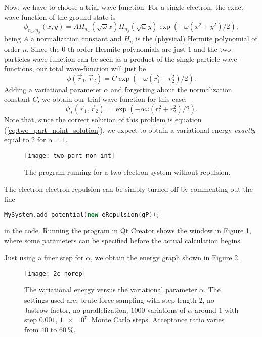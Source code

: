 Now, we have to choose a trial wave-function. For a single electron, the exact wave-function of the ground state is
\begin{equation}
	\phi_{n_x,n_y}(x, y) = A H_{n_x}(\sqrt{\omega}x)H_{n_y}(\sqrt{\omega}y)\exp\left(-\omega\left(x^2 + y^2\right)/2\right),
	\label{eq:phi_qnums}
\end{equation}
being $A$ a normalization constant and $H_n$ is the (physical) Hermite polynomial of order $n$. Since the 0-th order Hermite polynomials are just $1$ and the two-particles wave-function can be seen as a product of the single-particle wave-functions, our total wave-function will just be
\begin{equation}
	\phi(\vec{r}_1,\vec{r}_2) = C \exp\left(-\omega\left(r_1^2 + r_2^2\right)/2\right).
	\label{eq:two_part_noint_solution}
\end{equation}
Adding a variational parameter $\alpha$ and forgetting about the normalization constant $C$, we obtain our trial wave-function for this case:
\begin{equation}
	\psi_T(\vec{r}_1,\vec{r}_2) = \exp\left(-\alpha\omega\left(r_1^2 + r_2^2\right)/2\right).
\end{equation}
Note that, since the correct solution of this problem is equation (\ref{eq:two_part_noint_solution}), we expect to obtain a variational energy \emph{exactly} equal to 2 for $\alpha = 1$.

\begin{figure}[H]
	\centering
	\texttt{[image: two-part-non-int]}
	\caption{The program running for a two-electron system without repulsion.}
	\label{fig:run_window_2e_no_rep}
\end{figure}

The electron-electron repulsion can be simply turned off by commenting out the line
\begin{lstlisting}[language=cpp]
	MySystem.add_potential(new eRepulsion(gP));
\end{lstlisting}
in the code. Running the program in Qt Creator shows the window in Figure \ref{fig:run_window_2e_no_rep}, where some parameters can be specified before the actual calculation begins.

Just using a finer step for $\alpha$, we obtain the energy graph shown in Figure \ref{fig:2e_no_rep}.
\begin{figure}[H]
	\centering
	\texttt{[image: 2e-norep]}
	\caption{The variational energy versus the variational parameter $\alpha$. The settings used are: brute force sampling with step length 2, no Jastrow factor, no parallelization, $1000$ variations of $\alpha$ around $1$ with step $0.001$, $\SI{1e7}{}$ Monte Carlo steps. Acceptance ratio varies from $40$ to $\SI{60}{\percent}$.}
	\label{fig:2e_no_rep}
\end{figure}

